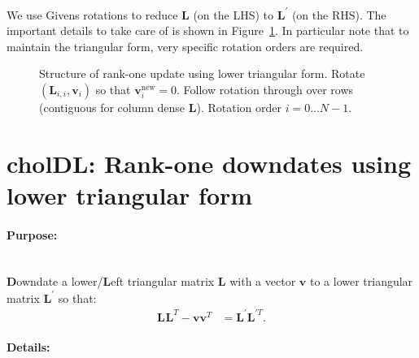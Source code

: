 \documentclass[oneside,english]{scrbook}
\begin{document}
We use Givens rotations to reduce $\bm{L}$ (on the LHS) to
$\bm{L}^{'}$ (on the RHS).  The important details to take care of is
shown in Figure~\ref{fig:UDL}. In particular note that to maintain the
triangular form, very specific rotation orders are required.


\begin{figure}[h]
  \begin{center}
    \caption{Structure of rank-one update using lower triangular
      form. Rotate $(\bm{L}_{i,i},\bm{v}_i)$ so that
      $\bm{v}_i^{\text{new}}=0$. Follow rotation through over rows
      (contiguous for column dense $\bm{L}$). Rotation order $i = 0
      \ldots N-1$.} \label{fig:UDL}
  \end{center}
\end{figure}

\section{cholDL: Rank-one downdates using lower triangular form}

\paragraph{Purpose:}~\\
\textbf{D}owndate a lower/\textbf{L}eft triangular matrix
$\bm{L}$ with a vector $\bm{v}$ to a lower triangular matrix
$\bm{L}^{'}$ so that:
\begin{align*}
    \bm{L}^{}\bm{L}^{T}-\bm{v}\bm{v}^T &= \bm{L}^{'}\bm{L}^{'T}.
\end{align*}

\paragraph{Details:}~\\
\end{document}
